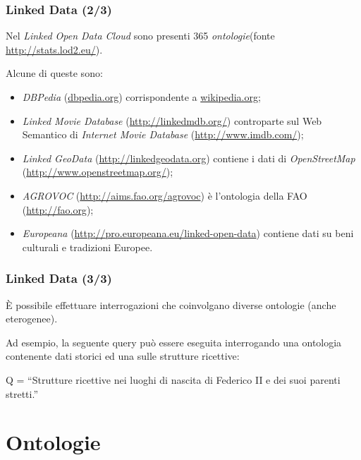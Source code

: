 \documentclass[8pt]{beamer}
\begin{document}
\begin{frame}
\frametitle{Linked Data (2/3)}
Nel \emph{Linked Open Data Cloud} sono presenti 365
\emph{ontologie}(fonte \url{http://stats.lod2.eu/}).
\vspace{\baselineskip}

Alcune di queste sono:
\begin{itemize}
 \item \emph{DBPedia} (\url{dbpedia.org}) corrispondente a \url{wikipedia.org};
 \item \emph{Linked Movie Database} (\url{http://linkedmdb.org/}) controparte sul Web Semantico di \emph{Internet Movie Database} 
 (\url{http://www.imdb.com/});
 \item \emph{Linked GeoData} (\url{http://linkedgeodata.org}) 
  contiene i dati di \emph{OpenStreetMap} (\url{http://www.openstreetmap.org/});
  \item \emph{AGROVOC} (\url{http://aims.fao.org/agrovoc}) \`e l'ontologia della
  FAO (\url{http://fao.org});
  \item \emph{Europeana} (\url{http://pro.europeana.eu/linked-open-data}) contiene dati su beni culturali e tradizioni Europee. 
\end{itemize}
\end{frame}

\begin{frame}
\frametitle{Linked Data (3/3)}
\`E possibile effettuare interrogazioni che coinvolgano diverse
ontologie (anche eterogenee).
\vspace{\baselineskip}

Ad esempio, la seguente query pu\`o essere eseguita
interrogando una ontologia contenente dati storici ed una 
sulle strutture ricettive:


\begin{center}
Q = “Strutture ricettive nei luoghi di nascita di Federico II e dei suoi parenti stretti.”
\end{center}
\end{frame}

\section{Ontologie}
\end{document}
